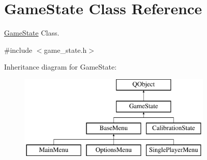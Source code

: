 \hypertarget{class_game_state}{\section{Game\-State Class Reference}
\label{class_game_state}
}


\hyperlink{class_game_state}{Game\-State} Class.  




{\ttfamily \#include $<$game\-\_\-state.\-h$>$}

Inheritance diagram for Game\-State\-:\begin{figure}[H]
\begin{center}
\leavevmode
\includegraphics[height=4.000000cm]{class_game_state}
\end{center}
\end{figure}
